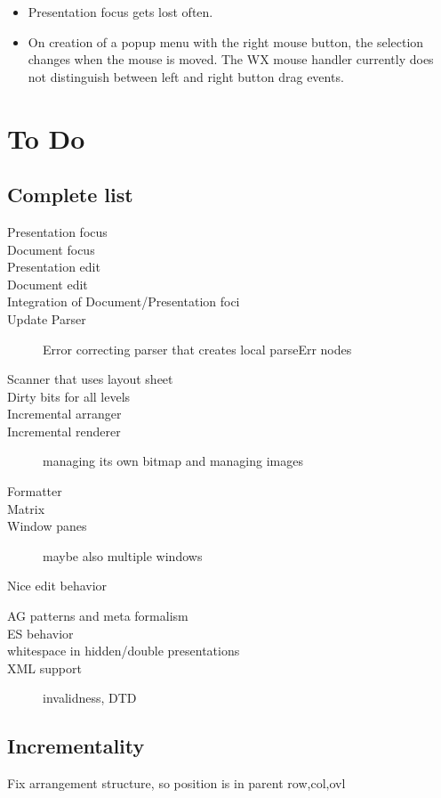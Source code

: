 \documentclass[]{article}
\begin{document}
\begin{itemize}
\item Presentation focus gets lost often.
\item On creation of a popup menu with the right mouse button, the selection changes when the mouse is moved. The WX mouse handler currently does not distinguish between left and right button drag events.
\end{itemize}


\section{To Do}
\subsection{Complete list}
\begin{description}
\item [Presentation focus]
\item [Document focus]
\item [Presentation edit]
\item [Document edit]
\item [Integration of Document/Presentation foci]
\item [Update Parser] Error correcting parser that creates local parseErr nodes
\item [Scanner that uses layout sheet] 
\item [Dirty bits for all levels]
\item [Incremental arranger]
\item [Incremental renderer] managing its own bitmap and managing images
\item [Formatter]
\item [Matrix]
\item [Window panes] maybe also multiple windows
\item [Nice edit behavior]
\end{description}

\begin{description}
\item [AG patterns and meta formalism]
\item [ES behavior]
\item [whitespace in hidden/double presentations]
\item [XML support] invalidness, DTD
\end{description}
\subsection{Incrementality}
Fix arrangement structure, so position is in parent row,col,ovl
\end{document}

